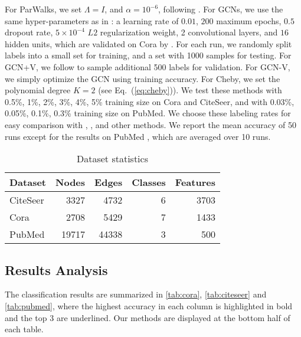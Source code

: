 \documentclass[letterpaper]{article} \usepackage{aaai18}  \usepackage{times}  \usepackage{helvet}  \usepackage{courier}  \usepackage{url}  \usepackage{graphicx}  \usepackage{algorithm}
\begin{document}
For ParWalks, we set $\Lambda = I$, and $\alpha=10^{-6}$, following \citeauthor{Wu12parw}. For GCNs, we use the same hyper-parameters as in \cite{kipf2016semi}: a learning rate of $0.01$, $200$ maximum epochs, $0.5$ dropout rate, $5\times10^{-4}$ $L2$ regularization weight, 2 convolutional layers, and $16$ hidden units, which are validated on Cora by \citeauthor{kipf2016semi}. For each run, we randomly split labels into a small set for training, and a set with 1000 samples for testing. For GCN+V, we follow \cite{kipf2016semi} to sample additional 500 labels for validation. For GCN-V, we simply optimize the GCN using training accuracy. For Cheby, we set the polynomial degree $K=2$ (see Eq.~(\ref{eq:cheby})). We test these methods with 0.5\%, 1\%, 2\%, 3\%, 4\%, 5\% training size on Cora and CiteSeer, and with 0.03\%, 0.05\%, 0.1\%, 0.3\% training size on PubMed. We choose these labeling rates for easy comparison with \cite{kipf2016semi}, \cite{yang2016revisiting}, and other methods. We report the mean accuracy of 50 runs except for the results on PubMed \cite{yang2016revisiting}, which are averaged over 10 runs.




\begin{table}
\caption{Dataset statistics}\label{tab:dataset}
\centering
\begin{tabular}{lrrrr}
\textbf{Dataset}    &    \textbf{Nodes}    &    \textbf{Edges}    &    \textbf{Classes}    &    \textbf{Features} \\
\midrule
CiteSeer    &    3327    &    4732    &    6        &    3703    \\
Cora     &    2708    &    5429    &    7        &    1433    \\
PubMed    &    19717    &    44338    &    3        &    500    \\
\end{tabular}
\end{table}








\subsection{Results Analysis}










The classification results are summarized in \tablename\;\ref{tab:cora}, \ref{tab:citeseer} and \ref{tab:pubmed}, where the highest accuracy in each column is highlighted in bold and the top 3 are underlined. Our methods are displayed at the bottom half of each table.
\end{document}
